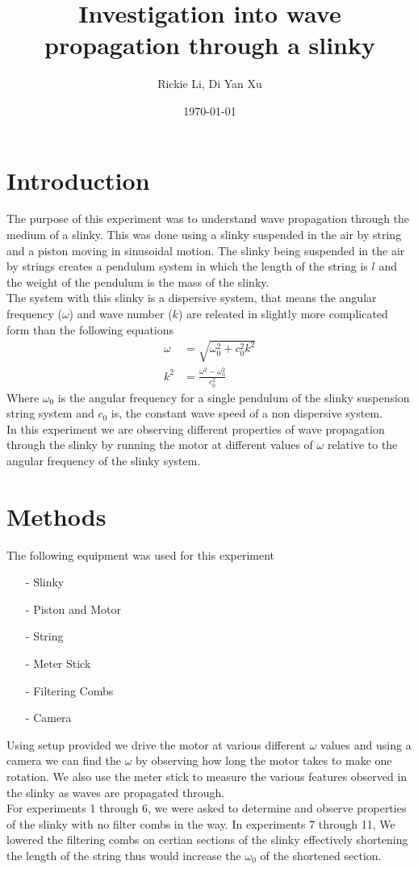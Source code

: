 \documentclass{article}
\title{Investigation into wave propagation through a slinky}
\author{Rickie Li, Di Yan Xu}
\date{\today}
\begin{document}
\maketitle

\newpage

\section{Introduction}
The purpose of this experiment was to understand wave propagation through the
medium of a slinky. This was done using a slinky suspended in the air by string
and a piston moving in sinusoidal motion. The slinky being suspended in the air
by strings creates a pendulum system in which the length of the string is $l$
and the weight of the pendulum is the mass of the slinky.\\
The system with this slinky is a dispersive system, that means the angular
frequency ($\omega$) and wave number ($k$) are releated in slightly more
complicated form than the following equations
\begin{align}
    \omega &= \sqrt{\omega_0^2 + c_0^2 k^2} \\
    k^2 &= \frac{\omega^2 - \omega_0^2}{c_0^2}
\end{align}
Where $\omega_0$ is the angular frequency for a single pendulum of the slinky
suspension string system and $c_0$ is, the constant wave speed of a
non dispersive system.\\
In this experiment we are observing different properties of wave propagation
through the slinky by running the motor at different values of $\omega$ relative
to the angular frequency of the slinky system.

\section{Methods}
The following equipment was used for this experiment
\begin{itemize}
    \item[-] Slinky
    \item[-]Piston and Motor
    \item[-] String
    \item[-] Meter Stick
    \item[-] Filtering Combs 
    \item[-] Camera
\end{itemize}
Using setup provided we drive the motor at various different $\omega$ values
and using a camera we can find the $\omega$ by observing how long the motor
takes to make one rotation. We also use the meter stick to measure the various
features observed in the slinky as waves are propagated through.\\
For experiments 1 through 6, we were asked to determine and observe properties
of the slinky with no filter combs in the way. In experiments 7 through 11, We
lowered the filtering combs on certian sections of the slinky effectively
shortening the length of the string thus would increase the $\omega_0$ of the
shortened section.
\end{document}
